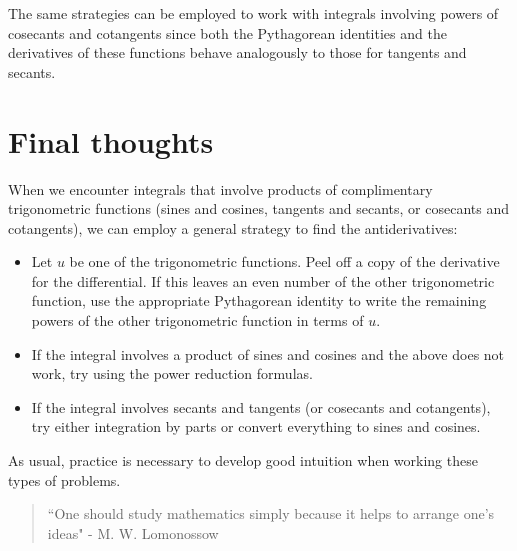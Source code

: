 \documentclass{ximera}
\begin{document}
\begin{remark}
The same strategies can be employed to work with integrals involving powers of cosecants and cotangents since both the Pythagorean identities and the derivatives of these functions behave analogously to those for tangents and secants.
\end{remark}


\section{Final thoughts}

When we encounter integrals that involve products of complimentary trigonometric functions (sines and cosines, tangents and secants, or cosecants and cotangents), we can employ a general strategy to find the antiderivatives:

\begin{itemize}
\item Let $u$ be one of the trigonometric functions.  Peel off a copy of the derivative for the differential.  If this leaves an even number of the other trigonometric function, use the appropriate Pythagorean identity to write the remaining powers of the other trigonometric function in terms of $u$.  
\item If the integral involves a product of sines and cosines and the above does not work, try using the power reduction formulas.
\item If the integral involves secants and tangents (or cosecants and cotangents), try either integration by parts or convert everything to sines and cosines.
\end{itemize}

As usual, practice is necessary to develop good intuition when working these types of problems.

\begin{quote}
``One should study mathematics simply because it helps to arrange one's ideas" - M. W. Lomonossow
\end{quote}
\end{document}
